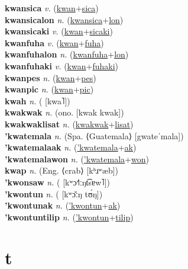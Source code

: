 \textbf{kwansica} \textit{v.} (\hyperref[kwan]{kwan}+\hyperref[sica]{sica})
 \label{kwansica} \\
\textbf{kwansicalon} \textit{n.} (\hyperref[kwansica]{kwansica}+\hyperref[lon]{lon})
 \label{kwansicalon} \\
\textbf{kwansicaki} \textit{v.} (\hyperref[kwan]{kwan}+\hyperref[sicaki]{sicaki})
 \label{kwansicaki} \\
\textbf{kwanfuha} \textit{v.} (\hyperref[kwan]{kwan}+\hyperref[fuha]{fuha})
 \label{kwanfuha} \\
\textbf{kwanfuhalon} \textit{n.} (\hyperref[kwanfuha]{kwanfuha}+\hyperref[lon]{lon})
 \label{kwanfuhalon} \\
\textbf{kwanfuhaki} \textit{v.} (\hyperref[kwan]{kwan}+\hyperref[fuhaki]{fuhaki})
 \label{kwanfuhaki} \\
\textbf{kwanpes} \textit{n.} (\hyperref[kwan]{kwan}+\hyperref[pes]{pes})
 \label{kwanpes} \\
\textbf{kwanpic} \textit{n.} (\hyperref[kwan]{kwan}+\hyperref[pic]{pic})
 \label{kwanpic} \\
\textbf{kwah} \textit{n.} ( [kwa˥])
 \label{kwah} \\
\textbf{kwakwak} \textit{n.} (ono. [kwak kwak])
 \label{kwakwak} \\
\textbf{kwakwaklisat} \textit{n.} (\hyperref[kwakwak]{kwakwak}+\hyperref[lisat]{lisat})
 \label{kwakwaklisat} \\
\textbf{'kwatemala} \textit{n.} (Spa. ⟨Guatemala⟩ [gwateˈmala])
 \label{'kwatemala} \\
\textbf{'kwatemalaak} \textit{n.} (\hyperref['kwatemala]{'kwatemala}+\hyperref[ak]{ak})
 \label{'kwatemalaak} \\
\textbf{'kwatemalawon} \textit{n.} (\hyperref['kwatemala]{'kwatemala}+\hyperref[won]{won})
 \label{'kwatemalawon} \\
\textbf{kwap} \textit{n.} (Eng. ⟨crab⟩ [kʰɹʷæb])
 \label{kwap} \\
\textbf{'kwonsaw} \textit{n.} ( [kʷɔ˧˥ːŋt͡sɐw˥])
 \label{'kwonsaw} \\
\textbf{'kwontun} \textit{n.} ( [kʷɔ̌ːŋ tʊ́ŋ])
 \label{'kwontun} \\
\textbf{'kwontunak} \textit{n.} (\hyperref['kwontun]{'kwontun}+\hyperref[ak]{ak})
 \label{'kwontunak} \\
\textbf{'kwontuntilip} \textit{n.} (\hyperref['kwontun]{'kwontun}+\hyperref[tilip]{tilip})
 \label{'kwontuntilip} 

\section{t}

